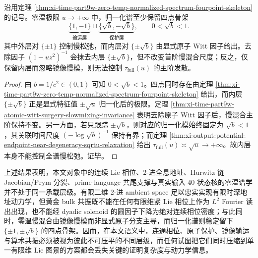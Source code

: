 \begin{corollary}[输运层与保护层的双层谱分裂]\label{cor:xi-time-part9w-transport-protection-two-layer-splitting}
沿用定理 \ref{thm:xi-time-part9w-zero-temp-normalized-spectrum-fourpoint-skeleton} 的记号。零温极限 \(u\to+\infty\) 中，归一化谱至少保留四点骨架
\[
\underbrace{\{1,-1\}}_{\text{输运层}}
\sqcup
\underbrace{\{\sqrt b,-\sqrt b\}}_{\text{保护层}},
\qquad 0<\sqrt b<1.
\]
其中外层对 \(\{\pm1\}\) 控制慢松弛，而内层对 \(\{\pm\sqrt b\}\) 由显式原子 Witt 因子给出。去除因子 \((1-uz^2)^{-1}\) 会抹去内层 \(\{\pm\sqrt b\}\)，但不改变首阶慢混合尺度；反之，仅保留内层而忽略镜像慢模，则无法控制 \(\tau_{\mathrm{full}}(u)\) 的主阶发散。
\end{corollary}
\begin{proof}
由 \(b=1/c^2\in(0,1)\) 可知 \(0<\sqrt b<1\)。四点同时存在由定理 \ref{thm:xi-time-part9w-zero-temp-normalized-spectrum-fourpoint-skeleton} 给出，而内层 \(\{\pm\sqrt b\}\) 正是显式特征值 \(\pm\sqrt u\) 归一化后的极限。定理 \ref{thm:xi-time-part9w-atomic-witt-surgery-slowmixing-invariance} 表明去除原子 Witt 因子后，慢混合主阶保持不变。另一方面，若只跟踪 \(\pm\sqrt b\)，则对应的归一化模始终固定为 \(\sqrt b<1\)，其关联时间尺度 \((-\log\sqrt b)^{-1}\) 保持有界；而定理 \ref{thm:xi-output-potential-endpoint-near-degeneracy-sqrtu-relaxation} 给出 \(\tau_{\mathrm{full}}(u)\asymp \sqrt u\to+\infty\)。故内层本身不能控制全谱慢松弛。证毕。
\end{proof}

\noindent
上述结果表明，本文对象中的连续 Lie 相位、\(2\)-进全息地址、Hurwitz 链 Jacobian/Prym 分裂、prime-language 共尾支撑与真实输入 \(40\) 状态核的零温谱学并不处于同一承载层级。有限二维 \(2\)-进 ambient space 足以忠实实现有限时深地址动力学，但黄金 bulk 共振既不能在任何有限维紧 Lie 相位上作为 \(L^2\) Fourier 读出出现，也不能经 dyadic solenoid 的圆因子下降为绝对连续相位密度；与此同时，零温慢混合由镜像慢模而非显式原子分支主导，而归一化谱则稳定留下 \(\{\pm1,\pm\sqrt b\}\) 的四点骨架。因而，在本文语义中，连通相位、原子保护、镜像输运与算术共振必须被视为彼此不可压平的不同层级，而任何试图把它们同时压缩到单一有限维 Lie 图景的方案都会丢失关键的证明复杂度与动力学信息。

\endinput
